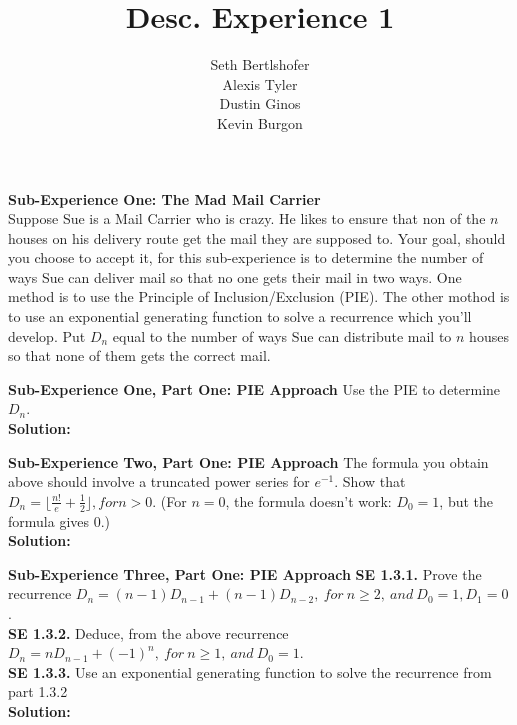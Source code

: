 \documentclass[10pt,a4paper]{report}
\author{Seth Bertlshofer\\Alexis Tyler\\Dustin Ginos\\Kevin Burgon}
\title{Desc. Experience 1}
\begin{document}
	\maketitle
	\textbf{Sub-Experience One: The Mad Mail Carrier}\\
	Suppose Sue is a Mail Carrier who is crazy.  He likes to ensure that non of the $n$ houses on his delivery route get the mail they are supposed to.  Your goal, should you choose to accept it, for this sub-experience is to determine the number of ways Sue can deliver mail so that no one gets their mail in two ways.  One method is to use the Principle of Inclusion/Exclusion (PIE).  The other mothod is to use an exponential generating function to solve a recurrence which you'll develop.  Put $D_n$ equal to the number of ways Sue can distribute mail to $n$ houses so that none of them gets the correct mail.
	
	\textbf{Sub-Experience One, Part One: PIE Approach}
	Use the PIE to determine $D_n$.\\
	
	\textbf{Solution: }\\
	\newline
	
	\textbf{Sub-Experience Two, Part One: PIE Approach}
	The formula you obtain above should involve a truncated power series for $e^{-1}$.  Show that $D_n = \lfloor\frac{n!}{e}+\frac{1}{2}\rfloor, for n > 0$. (For $n=0$, the formula doesn't work: $D_0 = 1$, but the formula gives 0.)\\
	\textbf{Solution: }\\
	\newline
	
	\textbf{Sub-Experience Three, Part One: PIE Approach}
	\textbf{SE 1.3.1.} Prove the recurrence $D_n = (n-1)D_{n-1} + (n-1)D_{n-2},\ for\ n\geq 2,\ and\ D_0 = 1, D_1=0$.\\
	\textbf{SE 1.3.2.} Deduce, from the above recurrence $D_n = nD_{n-1}+(-1)^n,\ for\ n\geq 1,\ and\ D_0 = 1$.\\
	\textbf{SE 1.3.3.} Use an exponential generating function to solve the recurrence from part 1.3.2\\
	\textbf{Solution: }\\
	\newline
	
\end{document}
